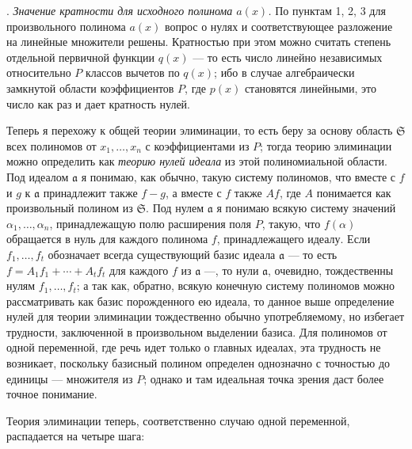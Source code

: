 \documentclass[11pt]{article}
\providecommand{\fraka}{\mathfrak a}
\providecommand{\frakS}{\mathfrak S}
\begin{document}
. \emph{Значение кратности для исходного полинома $a(x)$.} По пунктам 1, 2, 3 для произвольного полинома $a(x)$ вопрос о нулях и соответствующее разложение на линейные множители решены. Кратностью при этом можно считать степень отдельной первичной функции $q(x)$ --- то есть число линейно независимых относительно $P$ классов вычетов по $q(x)$; ибо в случае алгебраически замкнутой области коэффициентов $P$, где $p(x)$ становятся линейными, это число как раз и дает кратность нулей.

Теперь я перехожу к общей теории элиминации, то есть беру за основу область $\frakS$ всех полиномов от $x_1,\ldots,x_n$ с коэффициентами из $P$; тогда теорию элиминации можно определить как \emph{теорию нулей идеала} из этой полиномиальной области. Под идеалом $\fraka$ я понимаю, как обычно, такую систему полиномов, что вместе с $f$ и $g$ к $\fraka$ принадлежит также $f-g$, а вместе с $f$ также $Af$, где $A$ понимается как произвольный полином из $\frakS$. Под нулем $\fraka$ я понимаю всякую систему значений $\alpha_1,\ldots,\alpha_n$, принадлежащую полю расширения поля $P$, такую, что $f(\alpha)$ обращается в нуль для каждого полинома $f$, принадлежащего идеалу. Если $f_1,\ldots,f_t$ обозначает всегда существующий базис идеала $\fraka$ --- то есть $f=A_1f_1+\cdots+A_tf_t$ для каждого $f$ из $\fraka$ ---, то нули $\fraka$, очевидно, тождественны нулям $f_1,\ldots,f_t$; а так как, обратно, всякую конечную систему полиномов можно рассматривать как базис порожденного ею идеала, то данное выше определение нулей для теории элиминации тождественно обычно употребляемому, но избегает трудности, заключенной в произвольном выделении базиса. Для полиномов от одной переменной, где речь идет только о главных идеалах, эта трудность не возникает, поскольку базисный полином определен однозначно с точностью до единицы --- множителя из $P$; однако и там идеальная точка зрения даст более точное понимание.

Теория элиминации теперь, соответственно случаю одной переменной, распадается на четыре шага:
\end{document}
